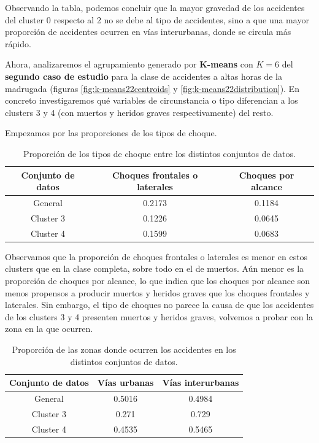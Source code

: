 \documentclass[oneside]{book}
\begin{document}
Observando la tabla, podemos concluir que la mayor gravedad de los
accidentes del cluster 0 respecto al 2 no se debe al tipo de
accidentes, sino a que una mayor proporción de accidentes ocurren en
vías interurbanas, donde se circula más rápido.

Ahora, analizaremos el agrupamiento generado por \textbf{K-means} con
$K=6$ del \textbf{segundo caso de estudio} para la clase de accidentes
a altas horas de la madrugada (figuras \ref{fig:k-means22centroids} y
\ref{fig:k-means22distribution}). En concreto investigaremos qué
variables de circunstancia o tipo diferencian a los clusters 3 y 4
(con muertos y heridos graves respectivamente) del resto.

Empezamos por las proporciones de los tipos de choque.

\begin{table}[H]
  \centering
\begin{tabular}{|c|cc|}
  \hline
  Conjunto de datos & Choques frontales o laterales & Choques por alcance \\ \hline
  General & 0.2173 & 0.1184 \\ \hline
  Cluster 3 & 0.1226 & 0.0645 \\ \hline
  Cluster 4 & 0.1599 & 0.0683 \\ \hline
\end{tabular}
\caption{Proporción de los tipos de choque entre los distintos conjuntos de datos.}
\label{tab:prop-choques1}
\end{table}

Observamos que la proporción de choques frontales o laterales es menor
en estos clusters que en la clase completa, sobre todo en el de
muertos. Aún menor es la proporción de choques por alcance, lo que
indica que los choques por alcance son menos propensos a producir
muertos y heridos graves que los choques frontales y laterales. Sin
embargo, el tipo de choques no parece la causa de que los accidentes
de los clusters 3 y 4 presenten muertos y heridos graves, volvemos a
probar con la zona en la que ocurren.

\begin{table}[H]
  \centering
\begin{tabular}{|c|cc|}
  \hline
  Conjunto de datos & Vías urbanas & Vías interurbanas \\ \hline
  General & 0.5016 & 0.4984 \\ \hline
  Cluster 3 & 0.271 & 0.729 \\ \hline
  Cluster 4 & 0.4535 & 0.5465 \\ \hline
\end{tabular}
\caption{Proporción de las zonas donde ocurren los accidentes en los distintos conjuntos de datos.}
\label{tab:prop-urbanas2}
\end{table}
\end{document}

